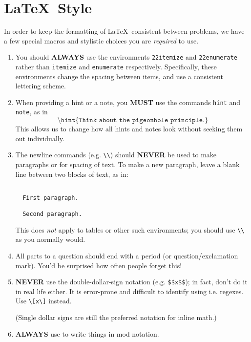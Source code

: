 {\section{\LaTeX\ Style}
  In order to keep the formatting of \LaTeX\ consistent between problems, we 
  have a few special macros and stylistic choices you are \textit{required}
  to use.
  
  \begin{enumerate}
    \item You should \textbf{ALWAYS} use the environments \texttt{22itemize} 
      and \texttt{22enumerate} rather than \texttt{itemize} and 
      \texttt{enumerate} respectively. Specifically, these environments 
      change the spacing between items, and use a consistent lettering scheme.
    \item When providing a hint or a note, you \textbf{MUST} use the 
      commands \texttt{hint} and \texttt{note}, as in 
      \[\texttt{\textbackslash hint\{Think about the pigeonhole principle.\}}\] 
      This allows us to change how all hints and notes look without seeking 
      them out individually.
    \item The newline commands (e.g. \texttt{\textbackslash\textbackslash}) 
      should \textbf{NEVER} be used to make paragraphs or for spacing of text. 
      To make a new paragraph, leave a blank line between two blocks of text, 
      as in: 
      \begin{verbatim}

  First paragraph.
  
  Second paragraph.

      \end{verbatim}
      
      This does \textit{not} apply to tables or other such environments; you
      should use \texttt{\textbackslash\textbackslash} as you normally would.
    \item All parts to a question should end with a period 
      (or question/exclamation mark). You'd be surprised how often people 
      forget this!
    \item \textbf{NEVER} use the double-dollar-sign notation 
      (e.g. \texttt{\$\$x\$\$}); in fact, don't do it in real life either. 
      It is error-prone and difficult to identify using i.e. regexes. Use 
      \texttt{\textbackslash[x\textbackslash]} instead.
    
      (Single dollar signs are still the preferred notation for inline math.)
    \item \textbf{ALWAYS} use  to write things in mod notation. 
      

\end{enumerate}}
